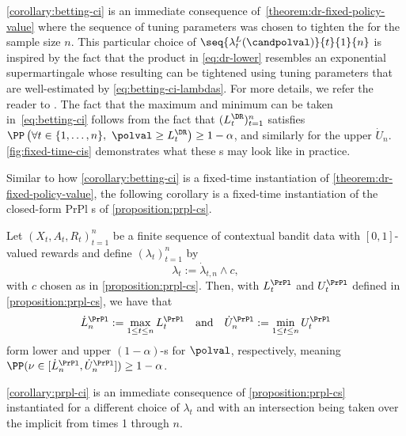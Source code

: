 \cref{corollary:betting-ci} is an immediate consequence of~\cref{theorem:dr-fixed-policy-value} where the sequence of tuning parameters was chosen to tighten the \ci{} for the sample size $n$. This particular choice of $\seq{\lambda_t^L(\candpolval)}{t}{1}{n}$ is inspired by the fact that the product in \eqref{eq:dr-lower} resembles an exponential supermartingale whose resulting \ci{} can be tightened using tuning parameters that are well-estimated by \eqref{eq:betting-ci-lambdas}. For more details, we refer the reader to \citet[Section 3]{waudby2020estimating}. The fact that the maximum and minimum can be taken in~\eqref{eq:betting-ci} follows from the fact that $(L_t^\DR)_{t=1}^n$ satisfies $\PP \left (\forall t \in \{1, \dots, n\},\ \polval \geq L_t^\DR \right ) \geq 1-\alpha$, and similarly for the upper \ci{} $\dot U_n$. \cref{fig:fixed-time-cis} demonstrates what these \ci{}s may look like in practice.

Similar to how \cref{corollary:betting-ci} is a fixed-time instantiation of \cref{theorem:dr-fixed-policy-value}, the following corollary is a fixed-time instantiation of the closed-form PrPl \cs{}s of \cref{proposition:prpl-cs}.
\begin{corollary}\label{corollary:prpl-ci}
  Let $(X_t, A_t, R_t)_{t=1}^n$ be a finite sequence of contextual bandit data with $[0, 1]$-valued rewards and define $(\lambda_t)_{t=1}^n$ by
  \begin{equation}
    \lambda_t := \dot \lambda_{t,n} \land c,
  \end{equation}
  with $c$ chosen as in \cref{proposition:prpl-cs}. Then, with $L_t^\PrPl$ and $U_t^\PrPl$ defined in \cref{proposition:prpl-cs}, we have that
  \begin{equation}
    \dot L_n^\PrPl := \max_{1 \leq t \leq n} L_t^\PrPl ~~~\text{and}~~~ \dot U_n^\PrPl := \min_{1 \leq t \leq n} U_t^\PrPl
  \end{equation}
  form lower and upper $(1-\alpha)$-\ci{}s for $\polval$, respectively, meaning $\PP( \nu \in [\dot L_n^\PrPl, \dot U_n^\PrPl] ) \geq 1-\alpha$.
\end{corollary}
\cref{corollary:prpl-ci} is an immediate consequence of \cref{proposition:prpl-cs} instantiated for a different choice of $\lambda_t$ and with an intersection being taken over the implicit \cs{} from times 1 through $n$.

